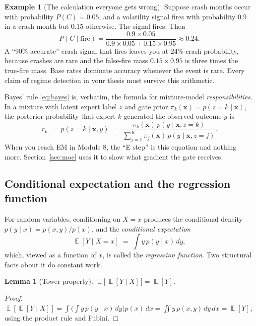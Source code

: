 \documentclass[11pt]{article}
\numberwithin{equation}{section}
\theoremstyle{plain}
\newtheorem{lemma}[theorem]{Lemma}
\theoremstyle{definition}
\newtheorem{example}[theorem]{Example}
\theoremstyle{remark}
\DeclareMathOperator{\E}{\mathbb{E}}
\newcommand{\x}{\bm{x}}
\begin{document}
\begin{example}[The calculation everyone gets wrong]\label{ex:regimebayes}
Suppose crash months occur with probability $P(C) = 0.05$, and a volatility signal fires with probability $0.9$ in a crash month but $0.15$ otherwise. The signal fires. Then
\[
P(C \mid \text{fire}) = \frac{0.9 \times 0.05}{0.9 \times 0.05 + 0.15 \times 0.95} \approx 0.24 .
\]
A ``90\% accurate'' crash signal that fires leaves you at 24\% crash probability, because crashes are rare and the false-fire mass $0.15 \times 0.95$ is three times the true-fire mass. Base rates dominate accuracy whenever the event is rare. Every claim of regime detection in your thesis must survive this arithmetic.
\end{example}

\begin{necbox}
Bayes' rule \eqref{eq:bayes} is, verbatim, the formula for mixture-model \emph{responsibilities}. In a mixture with latent expert label $z$ and gate prior $\pi_k(\x) = p(z = k \mid \x)$, the posterior probability that expert $k$ generated the observed outcome $y$ is
\[
r_k \;=\; p(z = k \mid \x, y) \;=\; \frac{\pi_k(\x)\, p(y \mid \x, z = k)}{\sum_{j=1}^{K} \pi_j(\x)\, p(y \mid \x, z = j)} .
\]
When you reach EM in Module 8, the ``E step'' is this equation and nothing more. Section~\ref{sec:moe} uses it to show what gradient the gate receives.
\end{necbox}

\subsection{Conditional expectation and the regression function}

For random variables, conditioning on $X = x$ produces the conditional density $p(y \mid x) = p(x,y)/p(x)$, and the \emph{conditional expectation}
\begin{equation}
\E[Y \mid X = x] \;=\; \int y\, p(y \mid x)\, dy,
\end{equation}
which, viewed as a function of $x$, is called the \emph{regression function}. Two structural facts about it do constant work.

\begin{lemma}[Tower property]\label{lem:tower}
$\E\big[\,\E[Y \mid X]\,\big] = \E[Y]$.
\end{lemma}
\begin{proof}
$\E[\E[Y\mid X]] = \int \!\big(\!\int y\, p(y \mid x)\, dy\big) p(x)\, dx = \iint y\, p(x,y)\, dy\, dx = \E[Y]$, using the product rule and Fubini.
\end{proof}
\end{document}

